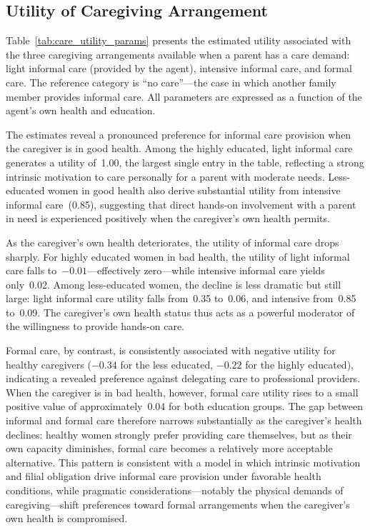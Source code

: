 \subsection{Utility of Caregiving Arrangement}
\label{sec:results_care_utility}

Table~\ref{tab:care_utility_params} presents the estimated utility
associated with the three caregiving arrangements available when a
parent has a care demand: light informal care (provided by the agent),
intensive informal care, and formal care.  The reference category is
``no care''---the case in which another family member provides
informal care.  All parameters are expressed as a function of the
agent's own health and education.

The estimates reveal a pronounced preference for informal care
provision when the caregiver is in good health.  Among the highly
educated, light informal care generates a utility of~1.00, the
largest single entry in the table, reflecting a strong intrinsic
motivation to care personally for a parent with moderate needs.
Less-educated women in good health also derive substantial utility
from intensive informal care~(0.85), suggesting that direct hands-on
involvement with a parent in need is experienced positively when the
caregiver's own health permits.

As the caregiver's own health deteriorates, the utility of informal
care drops sharply.  For highly educated women in bad health, the
utility of light informal care falls to~$-0.01$---effectively
zero---while intensive informal care yields only~0.02.  Among
less-educated women, the decline is less dramatic but still large:
light informal care utility falls from~0.35 to~0.06, and intensive
from~0.85 to~0.09.  The caregiver's own health status thus acts as a
powerful moderator of the willingness to provide hands-on care.

Formal care, by contrast, is consistently associated with negative
utility for healthy caregivers ($-0.34$ for the less educated, $-0.22$
for the highly educated), indicating a revealed preference against
delegating care to professional providers.  When the caregiver is in
bad health, however, formal care utility rises to a small positive
value of approximately~0.04 for both education groups.  The gap
between informal and formal care therefore narrows substantially as
the caregiver's health declines: healthy women strongly prefer
providing care themselves, but as their own capacity diminishes,
formal care becomes a relatively more acceptable alternative.  This
pattern is consistent with a model in which intrinsic motivation and
filial obligation drive informal care provision under favorable health
conditions, while pragmatic considerations---notably the physical
demands of caregiving---shift preferences toward formal arrangements
when the caregiver's own health is compromised.

